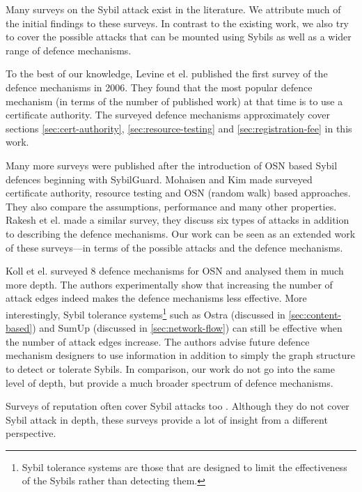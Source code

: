 Many surveys on the Sybil attack exist in the literature. We attribute much of
the initial findings to these surveys. In contrast to the existing work,
we also try to cover the possible attacks that can be mounted using Sybils as
well as a wider range of defence mechanisms.

To the best of our knowledge, Levine et el. published the first survey of the
defence mechanisms\cite{marti2006taxonomy} in 2006. They found that the most
popular defence mechanism (in terms of the number of published work) at that
time is to use a certificate authority. The surveyed defence mechanisms
approximately cover sections \ref{sec:cert-authority},
\ref{sec:resource-testing} and \ref{sec:registration-fee} in this work.

Many more surveys were published after the introduction of OSN based Sybil
defences beginning with SybilGuard. Mohaisen and Kim made surveyed certificate
authority, resource testing and OSN (random walk) based
approaches\cite{mohaisen2013sybil}. They also compare the assumptions,
performance and many other properties. Rakesh et el. made a similar
survey\cite{rakesh2014survey}, they discuss six types of attacks in addition to
describing the defence mechanisms. Our work can be seen as an extended work of
these surveys---in terms of the possible attacks and the defence mechanisms.

Koll et el. surveyed 8 defence mechanisms for OSN and analysed them in much more
depth\cite{koll2014state}. The authors experimentally show that increasing the
number of attack edges indeed makes the defence mechanisms less effective. More
interestingly, Sybil tolerance systems\footnote{Sybil tolerance systems are
  those that are designed to limit the effectiveness of the Sybils rather than
  detecting them.} such as Ostra (discussed in \autoref{sec:content-based}) and
SumUp (discussed in \autoref{sec:network-flow}) can still be effective when the
number of attack edges increase. The authors advise future defence mechanism
designers to use information in addition to simply the graph structure to detect
or tolerate Sybils. In comparison, our work do not go into the same level of
depth, but provide a much broader spectrum of defence mechanisms.

Surveys of reputation often cover Sybil attacks too \cite{marti2006taxonomy,
  hoffman2009survey, koutrouli2012taxonomy, selvaraj2012survey}. Although they
do not cover Sybil attack in depth, these surveys provide a lot of insight from
a different perspective.

